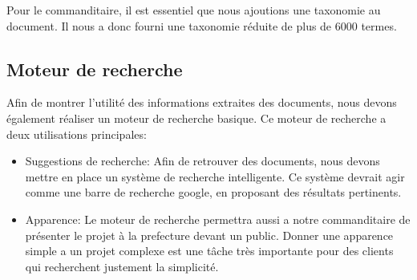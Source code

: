 Pour le commanditaire, il est essentiel que nous ajoutions une taxonomie au document.
Il nous a donc fourni une taxonomie réduite de plus de 6000 termes.


\subsection{Moteur de recherche}
Afin de montrer l'utilité des informations extraites des documents, nous devons également réaliser un moteur de recherche basique.
Ce moteur de recherche a deux utilisations principales: 
\begin{itemize}
\item Suggestions de recherche:
Afin de retrouver des documents, nous devons mettre en place un système de recherche intelligente.
Ce système devrait agir comme une barre de recherche google, en proposant des résultats pertinents.
\item Apparence:
Le moteur de recherche permettra aussi a notre commanditaire de présenter le projet à la prefecture devant un public.
Donner une apparence simple a un projet complexe est une tâche très importante pour des clients qui recherchent justement la simplicité.
\end{itemize}

